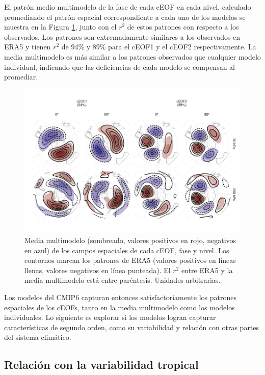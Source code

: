 \documentclass[12pt,oneside,a4paper]{reedthesis}
\begin{document}
El patrón medio multimodelo de la fase de cada cEOF en cada nivel, calculado promediando el patrón espacial correspondiente a cada uno de los modelos se muestra en la Figura \ref{fig:mmm}, junto con el \(r^2\) de estos patrones con respecto a los observados.
Los patrones son extremadamente similares a los observados en ERA5 y tienen \(r^2\) de 94\% y 89\% para el cEOF1 y el cEOF2 respectivamente.
La media multimodelo es más similar a los patrones observados que cualquier modelo individual, indicando que las deficiencias de cada modelo se compensan al promediar.

\begin{figure}

{\centering \includegraphics{figures/50-cmip6/mmm-1} 

}

\caption{Media multimodelo (sombreado, valores positivos en rojo, negativos en azul) de los campos espaciales de cada cEOF, fase y nivel. Los contornos marcan los patrones de ERA5 (valores positivos en líneas llenas, valores negativos en línea punteada). El \(r^2\) entre ERA5 y la media multimodelo está entre paréntesis. Unidades arbitrarias.}\label{fig:mmm}
\end{figure}



Los modelos del CMIP6 capturan entonces satisfactoriamente los patrones espaciales de los cEOFs, tanto en la media multimodelo como los modelos individuales.
Lo siguiente es explorar si los modelos logran capturar características de segundo orden, como su variabilidad y relación con otras partes del sistema climático.

\hypertarget{relaciuxf3n-con-la-variabilidad-tropical}{%
\subsection{Relación con la variabilidad tropical}\label{relaciuxf3n-con-la-variabilidad-tropical}}
\end{document}
